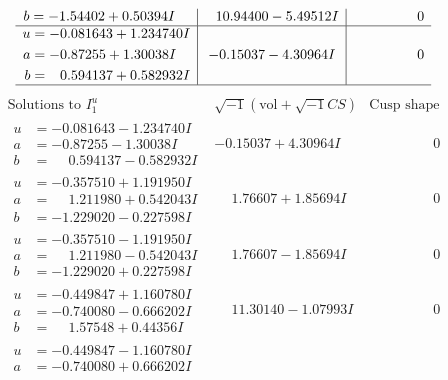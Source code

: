 \documentclass[1p]{elsarticle_modified}
\theoremstyle{definition}
\newcommand{\I}{\sqrt{-1}}
\begin{document}
$$\begin{array}{c|c|c}
\begin{aligned}
b &= -1.54402 + 0.50394 I\end{aligned}
 & \phantom{-}10.94400 - 5.49512 I & \phantom{-0.000000 } 0 \\ \hline\begin{aligned}
u &= -0.081643 + 1.234740 I \\
a &= -0.87255 + 1.30038 I \\
b &= \phantom{-}0.594137 + 0.582932 I\end{aligned}
 & -0.15037 - 4.30964 I & \phantom{-0.000000 } 0\\
 \hline 
 \end{array}$$\newpage$$\begin{array}{c|c|c}  
\text{Solutions to }I^u_{1}& \I (\text{vol} + \sqrt{-1}CS) & \text{Cusp shape}\\
 \hline 
\begin{aligned}
u &= -0.081643 - 1.234740 I \\
a &= -0.87255 - 1.30038 I \\
b &= \phantom{-}0.594137 - 0.582932 I\end{aligned}
 & -0.15037 + 4.30964 I & \phantom{-0.000000 } 0 \\ \hline\begin{aligned}
u &= -0.357510 + 1.191950 I \\
a &= \phantom{-}1.211980 + 0.542043 I \\
b &= -1.229020 - 0.227598 I\end{aligned}
 & \phantom{-}1.76607 + 1.85694 I & \phantom{-0.000000 } 0 \\ \hline\begin{aligned}
u &= -0.357510 - 1.191950 I \\
a &= \phantom{-}1.211980 - 0.542043 I \\
b &= -1.229020 + 0.227598 I\end{aligned}
 & \phantom{-}1.76607 - 1.85694 I & \phantom{-0.000000 } 0 \\ \hline\begin{aligned}
u &= -0.449847 + 1.160780 I \\
a &= -0.740080 - 0.666202 I \\
b &= \phantom{-}1.57548 + 0.44356 I\end{aligned}
 & \phantom{-}11.30140 - 1.07993 I & \phantom{-0.000000 } 0 \\ \hline\begin{aligned}
u &= -0.449847 - 1.160780 I \\
a &= -0.740080 + 0.666202 I \\

\end{aligned}
\end{array}$$
\end{document}
